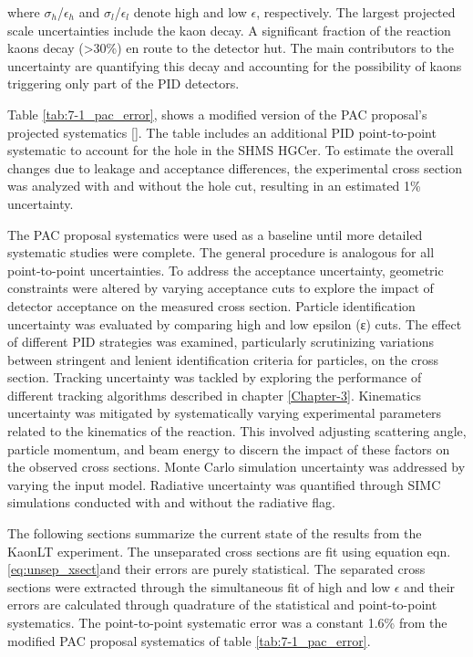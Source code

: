 \documentclass[
]{report}
\begin{document}
\noindent where \(\sigma_h\)/\(\epsilon_h\) and
\(\sigma_l\)/\(\epsilon_l\) denote high and low \(\epsilon\),
respectively. The largest projected scale uncertainties include the kaon
decay. A significant fraction of the reaction kaons decay
(\textgreater30\%) en route to the detector hut. The main contributors
to the uncertainty are quantifying this decay and accounting for the
possibility of kaons triggering only part of the PID detectors.



Table \ref{tab:7-1_pac_error}, shows a modified version of the PAC
proposal's projected systematics {[}\cite{bosted_studies_2008}{]}. The
table includes an additional PID point-to-point systematic to account
for the hole in the SHMS HGCer. To estimate the overall changes due to
leakage and acceptance differences, the experimental cross section was
analyzed with and without the hole cut, resulting in an estimated 1\%
uncertainty.

The PAC proposal systematics were used as a baseline until more detailed
systematic studies were complete. The general procedure is analogous for
all point-to-point uncertainties. To address the acceptance uncertainty,
geometric constraints were altered by varying acceptance cuts to explore
the impact of detector acceptance on the measured cross section.
Particle identification uncertainty was evaluated by comparing high and
low epsilon (ε) cuts. The effect of different PID strategies was
examined, particularly scrutinizing variations between stringent and
lenient identification criteria for particles, on the cross section.
Tracking uncertainty was tackled by exploring the performance of
different tracking algorithms described in chapter \ref{Chapter-3}.
Kinematics uncertainty was mitigated by systematically varying
experimental parameters related to the kinematics of the reaction. This
involved adjusting scattering angle, particle momentum, and beam energy
to discern the impact of these factors on the observed cross sections.
Monte Carlo simulation uncertainty was addressed by varying the input
model. Radiative uncertainty was quantified through SIMC simulations
conducted with and without the radiative flag.

\label{Chapter-6}

The following sections summarize the current state of the results from
the KaonLT experiment. The unseparated cross sections are fit using
equation eqn. \ref{eq:unsep_xsect}and their errors are purely
statistical. The separated cross sections were extracted through the
simultaneous fit of high and low \(\epsilon\) and their errors are
calculated through quadrature of the statistical and point-to-point
systematics. The point-to-point systematic error was a constant 1.6\%
from the modified PAC proposal systematics of table
\ref{tab:7-1_pac_error}.
\end{document}
